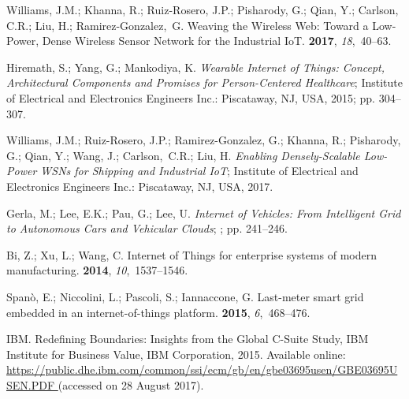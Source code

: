 \documentclass[symmetry,article,accept,moreauthors,pdftex10pt,a4paper]{mdpi}
\begin{document}
\begin{thebibliography}{999}

Williams, J.M.; Khanna, R.; Ruiz-Rosero, J.P.; Pisharody, G.; Qian, Y.;
Carlson, C.R.; Liu, H.; Ramirez-Gonzalez,~G.
\newblock Weaving the Wireless Web: Toward a Low-Power, Dense Wireless Sensor
Network for the Industrial IoT.
 {\bf 2017}, {\em 18},~40--63.

Hiremath, S.; Yang, G.; Mankodiya, K.
\newblock \emph{Wearable Internet of Things: Concept, Architectural Components and
	Promises for Person-Centered Healthcare};
\newblock Institute of Electrical and Electronics Engineers Inc.: Piscataway, NJ, USA, 2015; pp.
304--307.

Williams, J.M.; Ruiz-Rosero, J.P.; Ramirez-Gonzalez, G.; Khanna, R.;
Pisharody, G.; Qian, Y.; Wang, J.; Carlson,~C.R.; Liu, H.
\newblock \emph{Enabling Densely-Scalable Low-Power WSNs for Shipping and Industrial
	IoT};
\newblock Institute of Electrical and Electronics Engineers Inc.: Piscataway, NJ, USA, 2017.

Gerla, M.; Lee, E.K.; Pau, G.; Lee, U.
\newblock \emph{Internet of Vehicles: From Intelligent Grid to Autonomous Cars and
	Vehicular Clouds};
; pp. 241--246.

Bi, Z.; Xu, L.; Wang, C.
\newblock Internet of Things for enterprise systems of modern manufacturing.
 {\bf 2014}, {\em
	10},~1537--1546.

Spanò, E.; Niccolini, L.; Pascoli, S.; Iannaccone, G.
\newblock Last-meter smart grid embedded in an internet-of-things platform.
 {\bf 2015}, {\em 6},~468--476.

IBM.
\newblock Redefining Boundaries: Insights from the Global C-Suite Study,  IBM
Institute for Business Value, IBM Corporation, 2015.
\newblock Available online: \url{https://public.dhe.ibm.com/common/ssi/ecm/gb/en/gbe03695usen/GBE03695USEN.PDF
} (accessed on 28 August 2017).


\end{thebibliography}
\end{document}
